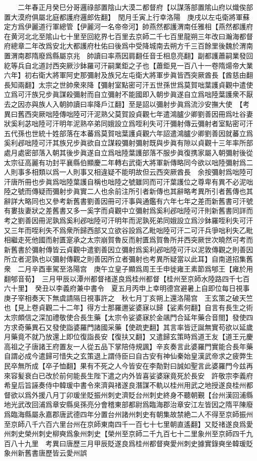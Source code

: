 　　二年春正月癸巳分哥邏祿部置陰山大漠二都督府【以謀落部置隂山府以熾俟部置大漠府俱屬北庭都護府邏郎佐翻】　閏月壬寅上行幸洛陽　庚戌以左屯衛將軍蘇定方爲伊麗道行軍總管【伊麗河一名帝帝河】帥燕然都護渭南任雅相【燕然都護府在黄河北北至隂山七十里至回紇界七百里去京師二千七百里龍朔三年改曰瀚海都督府總章二年改爲安北大都護府杜佑曰後爲中受降城南去朔方千三百餘里後魏於渭南置渭南郡隋廢爲縣屬京兆　帥讀曰率燕因肩翻任音壬相息亮翻】副都護蕭嗣業發回紇等兵自北道討西突厥沙鉢羅可汗嗣業鉅之子也【蕭鉅見一百八十一卷隋煬帝大業六年】初右衛大將軍阿史那彌射及族兄左屯衛大將軍步眞皆西突厥酋長【酋慈由翻長知兩翻】太宗之世帥衆來降【彌射室點密可汗五世孫世爲莫賀咄葉護貞觀中遣使立爲可汗族兄步眞謀殺彌射而自立彌射不能國即入朝步眞遂自立爲咄陸葉護衆不厭去之因亦與族人入朝帥讀曰率降戶江翻】至是詔以彌射步眞爲流沙安撫大使　【考異曰舊西突厥咄陸傳咄陸可汗泥熟父莫賀設貞觀七年遣鴻臚少卿劉善因冊爲吐谷妻狀奚利苾咄陸可汗明年泥熟卒弟同娥設立爲咥利失可汗彌射傳云彌射者室點密可汗五代孫也世統十姓部落在本蕃爲莫賀咄葉護貞觀六年詔遣鴻臚少卿劉善因就蕃立爲奚利邲咄陸可汗其族兄步眞欲自立謀殺彌射彌射既與步眞有隙以貞觀十三年率所部處月處密部落入朝其後步眞遂自立爲咄陸葉護部落不服步眞復携家屬入朝彌射後從太宗征高麗有功封平襄縣伯顯慶二年轉右武衛大將軍新傳略同今欲以咄陸彌射爲二人則事多相類以爲一人則事又相違疑不能明故但云西突厥酋長　余按彌射爲咄陸可汗唐所冊也步眞爲咄陸葉護自稱也咄陸之號雖同而可汗葉護位之尊卑有異不必泥咄陸之號而傳疑而彌射步眞實二人也余前注所引者新傳也其辭略考異所引者舊傳也其辭詳大略同也又參考新舊書劉善因冊可汗事與通鑑有六年七年之差而新舊書可汗號有婁抜妻狀之差舊書又多一奚字而貞觀中立彌射爲奚利邲咄陸可汗則新舊書同詳而考之劉善因冊泥孰爲奚利邲咄陸可汗明年而泥孰死弟同娥設立爲沙鉢羅咥利失可汗又三年而咥利失不爲衆所歸西部又立欲谷設爲乙毗咄陸可汗二可汗兵爭咄利失乙毗相繼走死他國而射匱寔承之太宗崩賀魯反而射匱爲賀魯所并西突厥世次曉然可考而新舊書於彌射傳皆云貞觀中遣劉善因立彌射爲奚利邲咄陸可汗以泥敦傳觀之則善因所立者泥孰也以彌射傳觀之則善因所立者彌射也考異所疑當以此耳】自南道招集舊衆　二月辛酉車駕至洛陽宫　庚午立皇子顯爲周王壬申徙雍王素節爲郇王【雍於用翻郇音荀】　三月甲辰以潭州都督禇遂良爲桂州都督【桂州至京師水陸路四千七百六十里】　癸丑以李義府兼中書令　夏五月丙申上幸明德宫避暑上自即位每日視事庚子宰相奏天下無虞請隔日視事許之　秋七月丁亥朔上還洛陽宫　王玄策之破天竺也【見上卷貞觀二十二年】得方士那羅邇娑婆寐以歸【娑素何翻】自言有長生之術太宗頗信之深加禮敬使合長生藥【太宗令娑婆寐於金飊門合延年藥合音閤】發使四方求奇藥異石又發使詣婆羅門諸國采藥【使疏吏翻】其言率皆迂誕無實苟欲以延歲月藥竟不就乃放還上即位復詣長安【復扶又翻】又遣歸玄策時爲道王友【道王元慶高祖之子唐諸王府置友一人從五品下掌陪侍規諷】辛亥奏言此婆羅門實能合長年藥自謂必成今遣歸可惜失之玄策退上謂侍臣曰自古安有神仙秦始皇漢武帝求之疲弊生民卒無所成【卒子恤翻】果有不死之人今皆安在李勣對曰誠如聖言此婆羅門今兹再來容髪衰白已改於前何能長生陛下遣之内外皆喜娑婆寐竟死於長安　許敬宗李義府希皇后旨誣奏侍中韓瑗中書令來濟與禇遂良潛謀不軌以桂州用武之地授遂良桂州都督欲以爲外援八月丁卯瑗坐貶振州刺史濟貶台州刺史終身不聽朝覲【台州漢回浦縣地光武改回浦爲章安縣吳孫亮分會稽東部都尉爲臨海郡治章安江左皆因之隋平陳廢爲臨海縣屬永嘉郡唐武德四年分置台州諸州刺史有朝集故禁絶二人不得至京師振州至京師八千六百六里台州在京師東南四千一百七十七里朝直遙翻】又貶禇遂良爲愛州刺史榮州刺史柳奭爲象州刺史【榮州至京師二千九百七十二里象州至京師四千九百八十九里　考異曰唐歷三月甲辰貶遂良爲桂州都督奭愛州刺史據實錄奭坐韓瑗貶象州新舊書唐歷皆云愛州誤